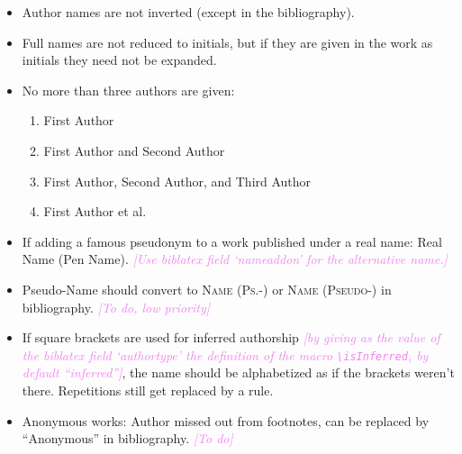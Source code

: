 \documentclass[extrafontsizes,11pt,a4paper,oneside]{memoir}
\newcommand*{\code}[1]{`\textsf{#1}'}
\newcommand*{\aside}[1]{\textcolor{violet}{\emph{[#1]}}}
\begin{document}
    \begin{itemize}
        \item Author names are not inverted (except in the bibliography).
        
        \item Full names are not reduced to initials, but if they are given in the work as initials they need not be expanded.
        
        \item No more than three authors are given:
        \begin{enumerate}
            \item First Author
            \\
            
            \item First Author and Second Author
            \\
            
            \item First Author, Second Author, and Third Author
            \\
            
            \item First Author et al.
            \\ %
        \end{enumerate}
        
        \item If adding a famous pseudonym to a work published under a real name: Real Name (Pen Name). \aside{Use \textsf{biblatex} field \code{nameaddon} for the alternative name.}\\
        
        \item Pseudo-Name should convert to \textsc{Name (Ps.-)} or \textsc{Name (Pseudo-)} in bibliography. \aside{To do, low priority}
        
        \item If square brackets are used for inferred authorship \aside{by giving as the value of the \textsf{biblatex} field \code{authortype} the definition of the macro \texttt{\textbackslash isInferred}, by default \enquote{inferred}}, the name should be alphabetized as if the brackets weren't there. Repetitions still get replaced by a rule.\\
        
        \item Anonymous works: Author missed out from footnotes, can be replaced by \enquote{Anonymous} in bibliography. \aside{To do}
        \\
        \\
    \end{itemize}
    
\end{document}
